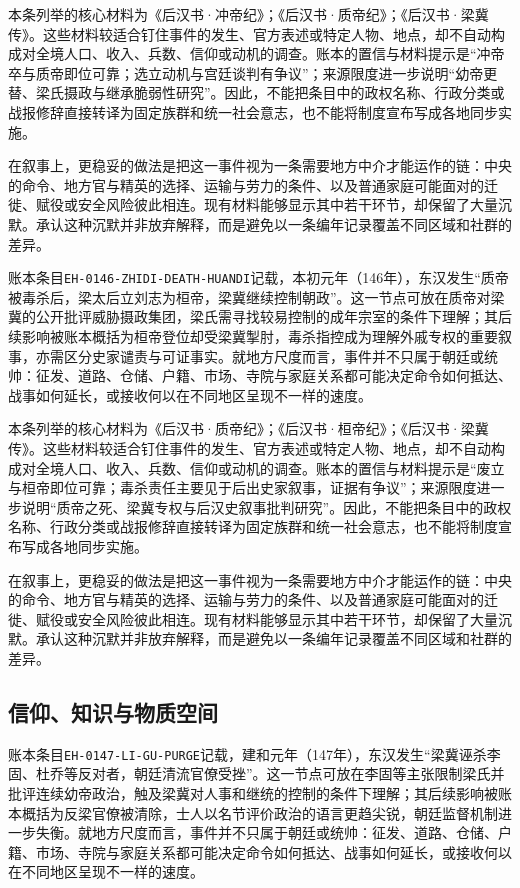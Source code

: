 本条列举的核心材料为《后汉书·冲帝纪》；《后汉书·质帝纪》；《后汉书·梁冀传》。这些材料较适合钉住事件的发生、官方表述或特定人物、地点，却不自动构成对全境人口、收入、兵数、信仰或动机的调查。账本的置信与材料提示是“冲帝卒与质帝即位可靠；选立动机与宫廷谈判有争议”；来源限度进一步说明“幼帝更替、梁氏摄政与继承脆弱性研究”。因此，不能把条目中的政权名称、行政分类或战报修辞直接转译为固定族群和统一社会意志，也不能将制度宣布写成各地同步实施。

在叙事上，更稳妥的做法是把这一事件视为一条需要地方中介才能运作的链：中央的命令、地方官与精英的选择、运输与劳力的条件、以及普通家庭可能面对的迁徙、赋役或安全风险彼此相连。现有材料能够显示其中若干环节，却保留了大量沉默。承认这种沉默并非放弃解释，而是避免以一条编年记录覆盖不同区域和社群的差异。

账本条目\texttt{EH-0146-ZHIDI-DEATH-HUANDI}记载，本初元年（146年），东汉发生“质帝被毒杀后，梁太后立刘志为桓帝，梁冀继续控制朝政”。这一节点可放在质帝对梁冀的公开批评威胁摄政集团，梁氏需寻找较易控制的成年宗室的条件下理解；其后续影响被账本概括为桓帝登位却受梁冀掣肘，毒杀指控成为理解外戚专权的重要叙事，亦需区分史家谴责与可证事实。就地方尺度而言，事件并不只属于朝廷或统帅：征发、道路、仓储、户籍、市场、寺院与家庭关系都可能决定命令如何抵达、战事如何延长，或接收何以在不同地区呈现不一样的速度。

本条列举的核心材料为《后汉书·质帝纪》；《后汉书·桓帝纪》；《后汉书·梁冀传》。这些材料较适合钉住事件的发生、官方表述或特定人物、地点，却不自动构成对全境人口、收入、兵数、信仰或动机的调查。账本的置信与材料提示是“废立与桓帝即位可靠；毒杀责任主要见于后出史家叙事，证据有争议”；来源限度进一步说明“质帝之死、梁冀专权与后汉史叙事批判研究”。因此，不能把条目中的政权名称、行政分类或战报修辞直接转译为固定族群和统一社会意志，也不能将制度宣布写成各地同步实施。

在叙事上，更稳妥的做法是把这一事件视为一条需要地方中介才能运作的链：中央的命令、地方官与精英的选择、运输与劳力的条件、以及普通家庭可能面对的迁徙、赋役或安全风险彼此相连。现有材料能够显示其中若干环节，却保留了大量沉默。承认这种沉默并非放弃解释，而是避免以一条编年记录覆盖不同区域和社群的差异。

\subsection{信仰、知识与物质空间}

账本条目\texttt{EH-0147-LI-GU-PURGE}记载，建和元年（147年），东汉发生“梁冀诬杀李固、杜乔等反对者，朝廷清流官僚受挫”。这一节点可放在李固等主张限制梁氏并批评连续幼帝政治，触及梁冀对人事和继统的控制的条件下理解；其后续影响被账本概括为反梁官僚被清除，士人以名节评价政治的语言更趋尖锐，朝廷监督机制进一步失衡。就地方尺度而言，事件并不只属于朝廷或统帅：征发、道路、仓储、户籍、市场、寺院与家庭关系都可能决定命令如何抵达、战事如何延长，或接收何以在不同地区呈现不一样的速度。

